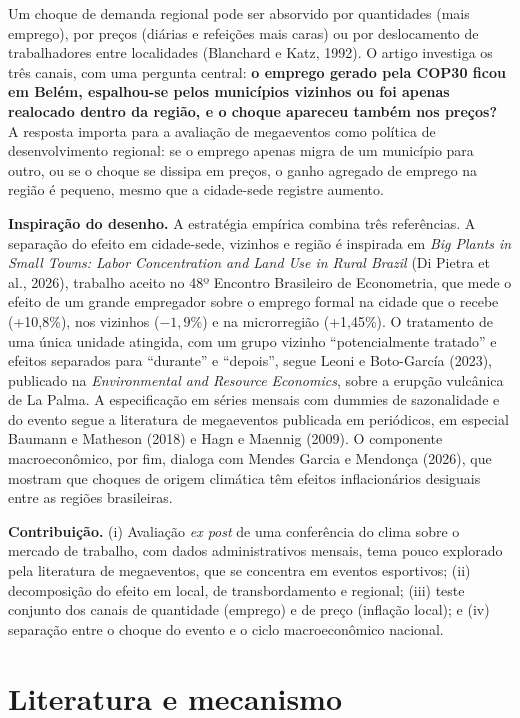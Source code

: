 \documentclass[12pt,a4paper]{article}
\begin{document}
Um choque de demanda regional pode ser absorvido por quantidades (mais emprego), por preços (diárias
e refeições mais caras) ou por deslocamento de trabalhadores entre localidades (Blanchard e Katz,
1992). O artigo investiga os três canais, com uma pergunta central: \textbf{o emprego gerado pela
COP30 ficou em Belém, espalhou-se pelos municípios vizinhos ou foi apenas realocado dentro da
região, e o choque apareceu também nos preços?} A resposta importa para a avaliação de megaeventos
como política de desenvolvimento regional: se o emprego apenas migra de um município para outro, ou se
o choque se dissipa em preços, o ganho agregado de emprego na região é pequeno, mesmo que a cidade-sede
registre aumento.

\textbf{Inspiração do desenho.} A estratégia empírica combina três referências. A separação do efeito
em cidade-sede, vizinhos e região é inspirada em \textit{Big Plants in Small Towns: Labor
Concentration and Land Use in Rural Brazil} (Di Pietra et al., 2026), trabalho aceito no 48º Encontro
Brasileiro de Econometria, que mede o efeito de um grande empregador sobre o emprego formal na cidade
que o recebe (+10,8\%), nos vizinhos ($-1{,}9\%$) e na microrregião (+1,45\%). O tratamento de uma
única unidade atingida, com um grupo vizinho ``potencialmente tratado'' e efeitos separados para
``durante'' e ``depois'', segue Leoni e Boto-García (2023), publicado na \textit{Environmental and
Resource Economics}, sobre a erupção vulcânica de La Palma. A especificação em séries mensais com
dummies de sazonalidade e do evento segue a literatura de megaeventos publicada em periódicos, em
especial Baumann e Matheson (2018) e Hagn e Maennig (2009). O componente macroeconômico, por fim,
dialoga com Mendes Garcia e Mendonça (2026), que mostram que choques de origem climática têm efeitos
inflacionários desiguais entre as regiões brasileiras.

\textbf{Contribuição.} (i) Avaliação \textit{ex post} de uma conferência do clima sobre o mercado de
trabalho, com dados administrativos mensais, tema pouco explorado pela literatura de megaeventos, que
se concentra em eventos esportivos; (ii) decomposição do efeito em local, de transbordamento e
regional; (iii) teste conjunto dos canais de quantidade (emprego) e de preço (inflação local); e
(iv) separação entre o choque do evento e o ciclo macroeconômico nacional.

\section{Literatura e mecanismo}
\end{document}
